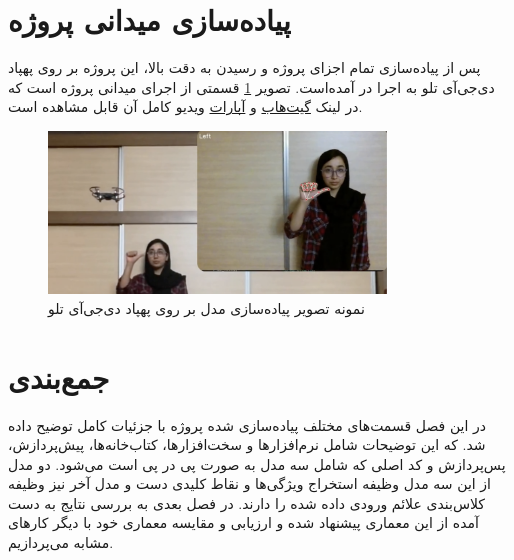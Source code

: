 \section{پیاده‌سازی میدانی پروژه}
پس از پیاده‌سازی تمام اجزای پروژه و رسیدن به دقت بالا، این پروژه بر روی پهپاد دی‌جی‌آی تلو به اجرا در آمده‌است. 
تصویر \ref{phisical} قسمتی از اجرای میدانی پروژه است که در لینک \href{https://github.com/sara-tajernia/hand-gesture-control_drone}{گیت‌هاب} و \href{https://www.aparat.com/v/chgtnhm}{آپارات} ویدیو کامل آن قابل مشاهده است.



\begin{figure}[h]
    \centering
    \includegraphics[width=0.8\textwidth]{drone_control.png}
    \caption{نمونه تصویر پیاده‌سازی مدل بر روی پهپاد دی‌جی‌آی تلو}
    \label{phisical}
\end{figure}

\section{جمع‌بندی}
در این فصل قسمت‌های مختلف پیاده‌سازی شده پروژه با جزئیات کامل توضیح داده شد. که این توضیحات شامل نرم‌افزار‌ها و سخت‌افزارها، کتاب‌خانه‌ها، پیش‌پردازش، پس‌پردازش و کد اصلی که شامل سه مدل به صورت پی در پی است می‌شود.
دو مدل از این سه مدل وظیفه استخراج ویژگی‌ها و نقاط کلیدی دست و مدل آخر نیز وظیفه کلاس‌بندی علائم ورودی داده شده را دارند.
در فصل بعدی به بررسی نتایج به دست آمده از این معماری پیشنهاد شده و ارزیابی و مقایسه معماری خود با دیگر کار‌های مشابه می‌پردازیم.


